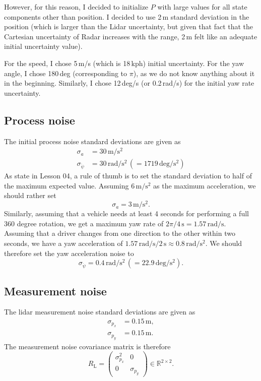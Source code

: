 \documentclass{scrartcl}
\begin{document}
However, for this reason, I decided to initialize $P$ with large values
for all state components other than position.
I decided to use 2\,m standard deviation in the position (which is larger
than the Lidar uncertainty, but given that fact that the Cartesian uncertainty
of Radar increases with the range, 2\,m felt like an adequate initial uncertainty value).

For the speed, I chose 5\,m/s (which is 18\,kph) initial uncertainty.
For the yaw angle, I chose 180\,deg (corresponding to $\pi$), as we do not
know anything about it in the beginning.
Similarly, I chose 12\,deg/s (or 0.2\,rad/s) for the initial yaw rate uncertainty.


\subsection{Process noise}

The initial process noise standard deviations are given as
\begin{align*}
	\sigma_a &= 30\,\text{m}/\text{s}^2 \\
	\sigma_{\ddot{\psi}} &= 30\,\text{rad}/\text{s}^2 \, (= 1719\,\text{deg}/\text{s}^2)
\end{align*}
As state in Lesson 04, a rule of thumb is to set the standard deviation
to half of the maximum expected value.
Assuming $6\,\text{m}/\text{s}^2$ as the maximum acceleration, we should rather set
\begin{equation}
	\sigma_a = 3\,\text{m}/\text{s}^2.
\end{equation}
Similarly, assuming that a vehicle needs at least 4 seconds for performing a full
360 degree rotation, we get a maximum yaw rate of $2 \pi / 4\,\text{s} = 1.57\,\text{rad}/\text{s}$.
Assuming that a driver changes from one direction to the other within two seconds, we have
a yaw acceleration of $1.57\,\text{rad}/\text{s} / 2\,\text{s} \approx 0.8\,\text{rad}/\text{s}^2$.
We should therefore set the yaw acceleration noise to
\begin{equation}
	\sigma_{\ddot{\psi}} = 0.4\,\text{rad}/\text{s}^2 \, (= 22.9\,\text{deg}/\text{s}^2).
\end{equation}

\subsection{Measurement noise}
The lidar measurement noise standard deviations are given as
\begin{align*}
	\sigma_{p_x} &= 0.15\,\text{m}, \\
	\sigma_{p_y} &= 0.15\,\text{m}.
\end{align*}
The measurement noise covariance matrix is therefore
\begin{equation}
	R_\text{L} = \left( \begin{array}{ccc}
		\sigma_{p_x}^2 & 0 \\
		0 & \sigma_{p_y}
		\end{array} \right) \in \mathbb{R}^{2 \times 2}.
\end{equation}
\end{document}
